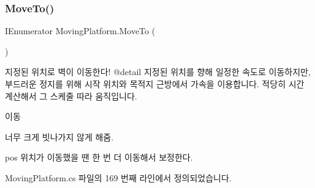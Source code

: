 \subsubsection{\texorpdfstring{MoveTo()}{MoveTo()}}
{\footnotesize\ttfamily I\+Enumerator Moving\+Platform.\+Move\+To (\begin{DoxyParamCaption}{ }\end{DoxyParamCaption})\hspace{0.3cm}{\ttfamily [private]}}



지정된 위치로 벽이 이동한다! @detail 지정된 위치를 향해 일정한 속도로 이동하지만, 부드러운 정지를 위해 시작 위치와 목적지 근방에서 가속을 이용합니다. 적당히 시간 계산해서 그 스케줄 따라 움직입니다. 

이동

너무 크게 빗나가지 않게 해줌.

pos 위치가 이동했을 땐 한 번 더 이동해서 보정한다. 

Moving\+Platform.\+cs 파일의 169 번째 라인에서 정의되었습니다.



